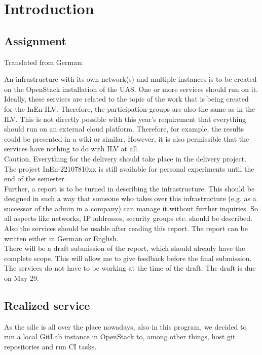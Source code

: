 \chapter{Introduction}

\section{Assignment}
Translated from German:

An infrastructure with its own network(s) and multiple instances is to be created on the OpenStack installation of the UAS.
One or more services should run on it.
Ideally, these services are related to the topic of the work that is being created for the InEn ILV.
Therefore, the participation groups are also the same as in the ILV.
This is not directly possible with this year's requirement that everything should run on an external cloud platform.
Therefore, for example, the results could be presented in a wiki or similar.
However, it is also permissible that the services have nothing to do with ILV at all.\\

Caution. Everything for the delivery should take place in the delivery project.
The project InEn-22107810xx is still available for personal experiments until the end of the semester.\\

Further, a report is to be turned in describing the infrastructure.
This should be designed in such a way that someone who takes over this infrastructure (e.g. as a successor of the admin in a company) can manage it without further inquiries.
So all aspects like networks, IP addresses, security groups etc. should be described.
Also the services should be usable after reading this report.
The report can be written either in German or English.\\

There will be a draft submission of the report, which should already have the complete scope.
This will allow me to give feedback before the final submission.
The services do not have to be working at the time of the draft.
The draft is due on May 29.

\section{Realized service}
As the \ac{sdlc} is all over the place nowadays, also in this program, we decided to run a local GitLab instance in OpenStack to, among other things, host git repositories and run CI tasks.
